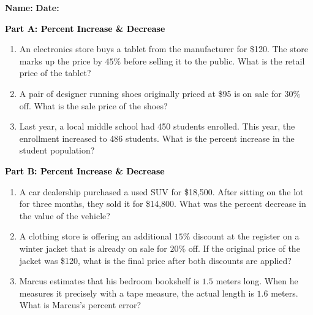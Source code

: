 \documentclass[12pt, letterpaper, fleqn]{article}
\begin{document}
\textbf{Name:} \underline{\hspace{5cm}}
\hfill
\textbf{Date:} \underline{\hspace{3cm}}\\

\begin{tcolorbox}[colback=customteal!20]
\large\textcolor{black}{\textbf{Part A: Percent Increase \& Decrease}}
\end{tcolorbox}

\vspace{3mm}

\begin{enumerate}[itemsep=4.2cm, leftmargin=0.6cm]
\item An electronics store buys a tablet from the manufacturer for \$120. The store marks up the price by $45\%$ before selling it to the public. What is the retail price of the tablet?
\item A pair of designer running shoes originally priced at \$95 is on sale for $30\%$ off. What is the sale price of the shoes?
\item Last year, a local middle school had 450 students enrolled. This year, the enrollment increased to 486 students. What is the percent increase in the student population?
\end{enumerate}

\newpage

\begin{tcolorbox}[colback=customteal!20]
\large\textcolor{black}{\textbf{Part B: Percent Increase \& Decrease}}
\end{tcolorbox}

\vspace{3mm}

\begin{enumerate}[itemsep=4.2cm, leftmargin=0.6cm, resume]
\item A car dealership purchased a used SUV for \$18,500. After sitting on the lot for three months, they sold it for \$14,800. What was the percent decrease in the value of the vehicle?
\item A clothing store is offering an additional $15\%$ discount at the register on a winter jacket that is already on sale for $20\%$ off. If the original price of the jacket was \$120, what is the final price after both discounts are applied?
\item Marcus estimates that his bedroom bookshelf is $1.5$ meters long. When he measures it precisely with a tape measure, the actual length is $1.6$ meters. What is Marcus's percent error?
\end{enumerate}
\end{document}
